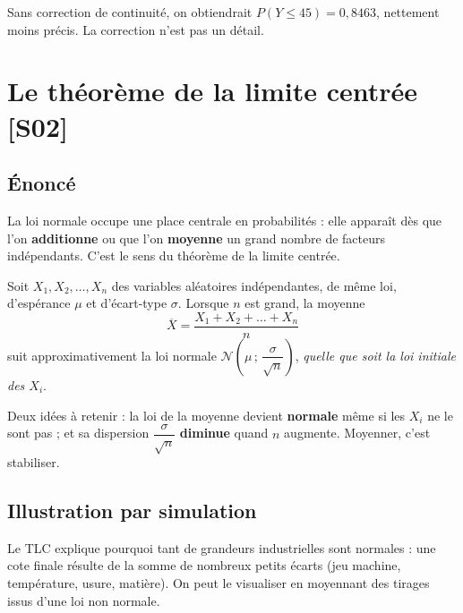 \documentclass[a4paper,11pt]{article}
\begin{document}
\begin{remarque}
Sans correction de continuité, on obtiendrait $P(Y \leq 45) = 0{,}8463$, nettement moins précis. La correction n'est pas un détail.
\end{remarque}

\newpage
\section{Le théorème de la limite centrée \hfill {\normalsize\color{uimmred}[S02]}}

\subsection{Énoncé}

La loi normale occupe une place centrale en probabilités : elle apparaît dès que l'on \textbf{additionne} ou que l'on \textbf{moyenne} un grand nombre de facteurs indépendants. C'est le sens du théorème de la limite centrée.

\begin{theoreme}
Soit $X_1, X_2, \dots, X_n$ des variables aléatoires indépendantes, de même loi, d'espérance $\mu$ et d'écart-type $\sigma$. Lorsque $n$ est grand, la moyenne
\[
\overline{X} = \frac{X_1 + X_2 + \dots + X_n}{n}
\]
suit approximativement la loi normale $\mathcal{N}\!\left(\mu\,;\,\dfrac{\sigma}{\sqrt{n}}\right)$, \emph{quelle que soit la loi initiale des $X_i$}.
\end{theoreme}

\begin{remarque}
Deux idées à retenir : la loi de la moyenne devient \textbf{normale} même si les $X_i$ ne le sont pas ; et sa dispersion $\dfrac{\sigma}{\sqrt{n}}$ \textbf{diminue} quand $n$ augmente. Moyenner, c'est stabiliser.
\end{remarque}

\subsection{Illustration par simulation}

Le TLC explique pourquoi tant de grandeurs industrielles sont normales : une cote finale résulte de la somme de nombreux petits écarts (jeu machine, température, usure, matière). On peut le visualiser en moyennant des tirages issus d'une loi non normale.
\end{document}
